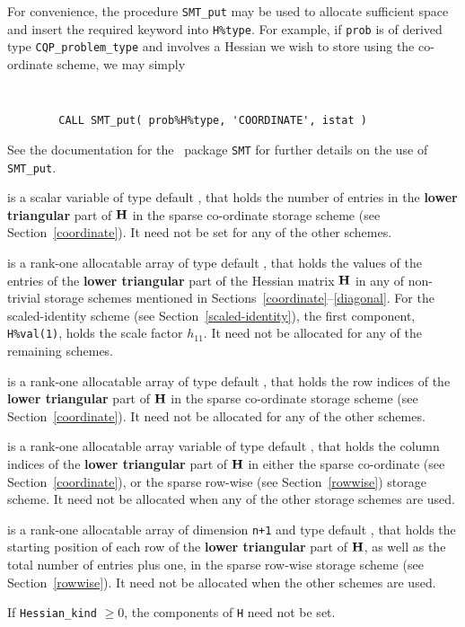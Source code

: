 \documentclass{galahad}
\newcommand{\packagename}{CQP}
\begin{document}
\begin{description}
\begin{description}
For convenience, the procedure {\tt SMT\_put}
may be used to allocate sufficient space and insert the required keyword
into {\tt H\%type}.
For example, if {\tt prob} is of derived type {\tt \packagename\_problem\_type}
and involves a Hessian we wish to store using the co-ordinate scheme,
we may simply
{\tt
\begin{verbatim}
        CALL SMT_put( prob%H%type, 'COORDINATE', istat )
\end{verbatim}
}
\noindent
See the documentation for the \galahad\ package {\tt SMT}
for further details on the use of {\tt SMT\_put}.

 is a scalar variable of type default \integer, that
holds the number of entries in the {\bf lower triangular} part of ${\mathbf{H}}$
in the sparse co-ordinate storage scheme (see Section~\ref{coordinate}).
It need not be set for any of the other schemes.

 is a rank-one allocatable array of type default \realdp, that holds
the values of the entries of the {\bf lower triangular} part
of the Hessian matrix ${\mathbf{H}}$ in any of non-trivial storage schemes
mentioned in Sections~\ref{coordinate}--\ref{diagonal}.
For the scaled-identity scheme (see Section~\ref{scaled-identity}),
the first component, {\tt H\%val(1)}, holds the scale factor $h_{11}$.
It need not be allocated for any of the remaining schemes.

 is a rank-one allocatable array of type default \integer,
that holds the row indices of the {\bf lower triangular} part of ${\mathbf{H}}$
in the sparse co-ordinate storage scheme (see Section~\ref{coordinate}).
It need not be allocated for any of the other schemes.

 is a rank-one allocatable array variable of type default \integer,
that holds the column indices of the {\bf lower triangular} part of
${\mathbf{H}}$ in either the sparse co-ordinate
(see Section~\ref{coordinate}), or the sparse row-wise
(see Section~\ref{rowwise}) storage scheme.
It need not be allocated when any of the other storage schemes are used.

 is a rank-one allocatable array of dimension {\tt n+1} and type
default \integer, that holds the starting position of
each row of the {\bf lower triangular} part of ${\mathbf{H}}$, as well
as the total number of entries plus one, in the sparse row-wise storage
scheme (see Section~\ref{rowwise}). It need not be allocated when the
other schemes are used.
\end{description}
If {\tt Hessian\_kind} $\geq 0$, the components of {\tt H} need not be set.


\end{description}
\end{document}
